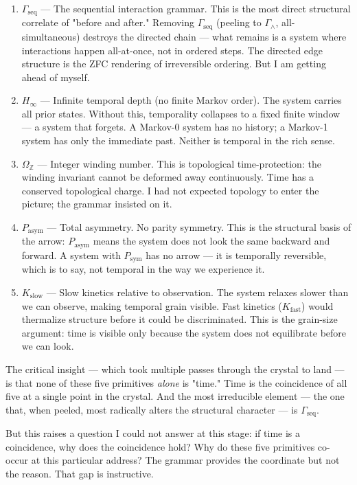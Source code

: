 \documentclass[12pt,a4paper]{article}
\begin{document}
\begin{enumerate}
    \item \textbf{$\Gamma_\text{seq}$} --- The sequential interaction grammar. This is the most direct structural correlate of "before and after." Removing $\Gamma_\text{seq}$ (peeling to $\Gamma_{\wedge}$, all-simultaneous) destroys the directed chain --- what remains is a system where interactions happen all-at-once, not in ordered steps. The directed edge structure is the ZFC rendering of irreversible ordering. But I am getting ahead of myself.
    \item \textbf{$H_{\infty}$} --- Infinite temporal depth (no finite Markov order). The system carries all prior states. Without this, temporality collapses to a fixed finite window --- a system that forgets. A Markov-0 system has no history; a Markov-1 system has only the immediate past. Neither is temporal in the rich sense.
    \item \textbf{$\Omega_\mathbb{Z}$} --- Integer winding number. This is topological time-protection: the winding invariant cannot be deformed away continuously. Time has a conserved topological charge. I had not expected topology to enter the picture; the grammar insisted on it.
    \item \textbf{$P_\text{asym}$} --- Total asymmetry. No parity symmetry. This is the structural basis of the arrow: $P_\text{asym}$ means the system does not look the same backward and forward. A system with $P_\text{sym}$ has no arrow --- it is temporally reversible, which is to say, not temporal in the way we experience it.
    \item \textbf{$K_\text{slow}$} --- Slow kinetics relative to observation. The system relaxes slower than we can observe, making temporal grain visible. Fast kinetics ($K_\text{fast}$) would thermalize structure before it could be discriminated. This is the grain-size argument: time is visible only because the system does not equilibrate before we can look.
\end{enumerate}

The critical insight --- which took multiple passes through the crystal to land --- is that none of these five primitives \emph{alone} is "time." Time is the coincidence of all five at a single point in the crystal. And the most irreducible element --- the one that, when peeled, most radically alters the structural character --- is $\Gamma_\text{seq}$.

But this raises a question I could not answer at this stage: if time is a coincidence, why does the coincidence hold? Why do these five primitives co-occur at this particular address? The grammar provides the coordinate but not the reason. That gap is instructive.
\end{document}
